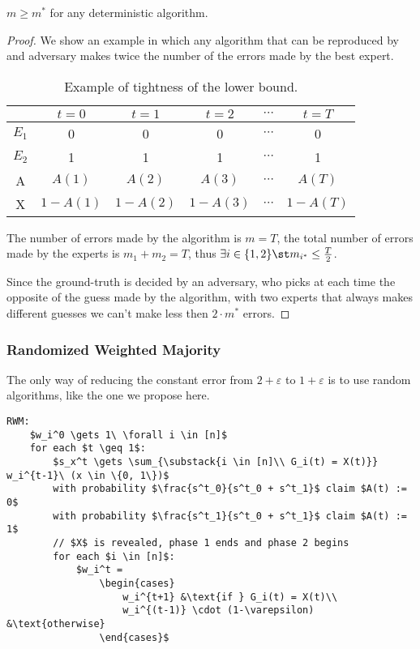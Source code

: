 \begin{thm}\label{thm:exp-lb}
    $m \geq m^*$ for any deterministic algorithm.
\end{thm}
\begin{proof}
    We show an example in which any algorithm that can be reproduced by and adversary makes twice the number of the errors made by the best expert.
    
    \begin{table}[h!]
        \centering
        \begin{tabular}{c|c|c|c|c|c}
            & $t=0$    & $t=1$    & $t=2$    & $\cdots$ & $t=T$    \\ \hline
            $E_1$ & 0        & 0        & 0        & $\cdots$ & 0        \\
            $E_2$ & 1        & 1        & 1        & $\cdots$ & 1        \\
            A     & $A(1)$   & $A(2)$   & $A(3)$   & $\cdots$ & $A(T)$   \\
            X     & $1-A(1)$ & $1-A(2)$ & $1-A(3)$ & $\cdots$ & $1-A(T)$
        \end{tabular}
        \caption{Example of tightness of the lower bound.}
        \label{tab:exp-lb}
    \end{table}

    The number of errors made by the algorithm is $m = T$, the total number of errors made by the experts is $m_1 + m_2 = T$, thus $\exists i \in \{1,2\} \st m_{i^*} \leq \frac{T}{2}$.

    Since the ground-truth is decided by an adversary, who picks at each time the opposite of the guess made by the algorithm, with two experts that always makes different guesses we can't make less then $2 \cdot m^*$ errors.
\end{proof}


\subsubsection{Randomized Weighted Majority}
\label{sec:exp-random-weighted-maj}

The only way of reducing the constant error from $2+\varepsilon$ to $1 + \varepsilon$ is to use random algorithms, like the one we propose here.

\begin{lstlisting}[caption={Randomized Weighted Majority}, label={lst:exp-rwm}]
RWM:
    $w_i^0 \gets 1\ \forall i \in [n]$
    for each $t \geq 1$:
        $s_x^t \gets \sum_{\substack{i \in [n]\\ G_i(t) = X(t)}} w_i^{t-1}\ (x \in \{0, 1\})$
        with probability $\frac{s^t_0}{s^t_0 + s^t_1}$ claim $A(t) := 0$
        with probability $\frac{s^t_1}{s^t_0 + s^t_1}$ claim $A(t) := 1$
        // $X$ is revealed, phase 1 ends and phase 2 begins
        for each $i \in [n]$:
            $w_i^t = 
                \begin{cases}
                    w_i^{t+1} &\text{if } G_i(t) = X(t)\\
                    w_i^{(t-1)} \cdot (1-\varepsilon) &\text{otherwise}
                \end{cases}$
\end{lstlisting}

